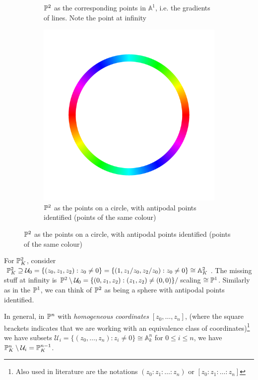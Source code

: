 \documentclass[10pt,a4paper,rgb]{article}
\newcommand{\A}{\mathbb{A}}
\begin{document}
\begin{figure}[H]
\begin{subfigure}{.4\textwidth}
\caption{$\P^2$ as the corresponding points in $\A^1$, i.e. the gradients of lines. Note the point at infinity}
\end{subfigure}\hfill
\begin{subfigure}{.4\textwidth}
\includegraphics[scale=.1]{circle.png}
\caption{$\P^2$ as the points on a circle, with antipodal points identified (points of the same colour)}
\end{subfigure}
\end{figure}

For $\P^2_K$, consider $\P^2_K \supseteq \mathcal{U}_0 = \{(z_0,z_1,z_2):z_0 \neq 0\} = \{(1,z_1/z_0,z_2/z_0):z_0\neq 0\} \cong \mathbb{A}_K^2$. The missing stuff at infinity is $\P^2 \setminus \mathcal{U}_0 = \{(0,z_1, z_2): (z_1,z_2) \neq (0,0)\}/$scaling $ \cong \P^1$. Similarly as in the $\P^1$, we can think of $\P^2$ as being a sphere with antipodal points identified.

In general, in $\P^n$ with \emph{homogeneous coordinates} $[z_0, \ldots, z_n]$, (where the square brackets indicates that we are working with an equivalence class of coordinates)\footnote{Also used in literature are the notations $(z_0:z_1:\ldots:z_n)$ or $[z_0:z_1:\ldots:z_n]$} we have subsets $\mathcal{U}_i = \{(z_0, \ldots, z_n):z_i \neq 0\}\cong \mathbb{A}_k^n$ for $0\leq i\leq n$, we have $\P_K^n \setminus \mathcal{U}_i = \P_K^{n-1}$.
\end{document}
